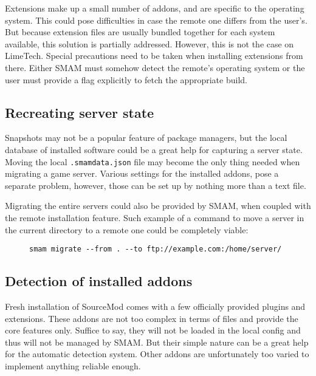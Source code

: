 Extensions make up a small number of addons, and are specific to the operating system.
This could pose difficulties in case the remote one differs from the user's.
But because extension files are usually bundled together for each system available, this solution is partially addressed.
However, this is not the case on LimeTech.
Special precautions need to be taken when installing extensions from there.
Either SMAM must somehow detect the remote's operating system or the user must provide a flag explicitly to fetch the appropriate build.

\subsection{Recreating server state}

Snapshots may not be a popular feature of package managers, but the local database of installed software could be a great help for capturing a server state.
Moving the local \verb|.smamdata.json| file may become the only thing needed when migrating a game server.
Various settings for the installed addons, pose a separate problem, however, those can be set up by nothing more than a text file.

Migrating the entire servers could also be provided by SMAM, when coupled with the remote installation feature.
Such example of a command to move a server in the current directory to a remote one could be completely viable:

\begin{figure}[htp]
\centering
\verb|smam migrate --from . --to ftp://example.com:/home/server/|
\end{figure}

\subsection{Detection of installed addons}

Fresh installation of SourceMod comes with a few officially provided plugins and extensions.
These addons are not too complex in terms of files and provide the core features only.
Suffice to say, they will not be loaded in the local config and thus will not be managed by SMAM\@.
But their simple nature can be a great help for the automatic detection system.
Other addons are unfortunately too varied to implement anything reliable enough.
